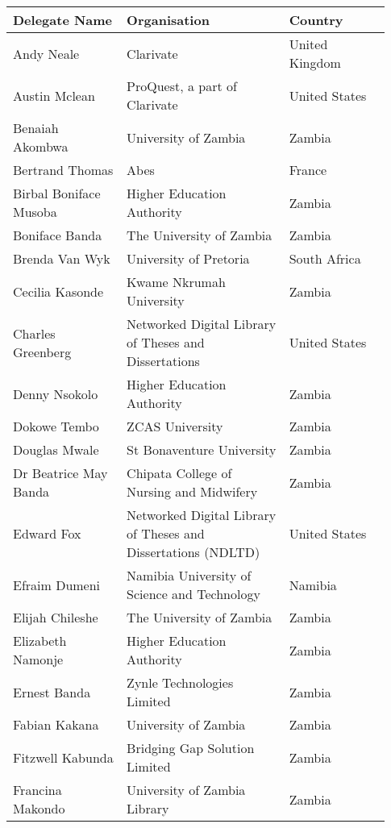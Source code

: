 
\begin{center}
\begin{longtable}{p{0.28\linewidth} p{0.4\linewidth} p{0.25\linewidth}}
\toprule
\textbf{Delegate Name} & \textbf{Organisation} & \textbf{Country} \\
\midrule
Andy Neale & Clarivate & United Kingdom \\  \hline
Austin Mclean & ProQuest, a part of Clarivate & United States \\  \hline
Benaiah Akombwa & University of Zambia & Zambia \\  \hline
Bertrand Thomas & Abes & France \\  \hline
Birbal Boniface Musoba & Higher Education Authority & Zambia \\  \hline
Boniface Banda & The University of Zambia & Zambia \\  \hline
Brenda Van Wyk & University of Pretoria & South Africa \\  \hline
Cecilia Kasonde & Kwame Nkrumah University & Zambia \\  \hline
Charles Greenberg & Networked Digital Library of Theses and Dissertations & United States \\  \hline
Denny Nsokolo & Higher Education Authority & Zambia \\  \hline
Dokowe Tembo & ZCAS University & Zambia \\  \hline
Douglas Mwale & St Bonaventure University & Zambia \\  \hline
Dr Beatrice May Banda & Chipata College of Nursing and Midwifery & Zambia \\  \hline
Edward Fox & Networked Digital Library of Theses and Dissertations (NDLTD) & United States \\  \hline
Efraim Dumeni & Namibia University of Science and Technology & Namibia \\  \hline
Elijah Chileshe & The University of Zambia & Zambia \\  \hline
Elizabeth Namonje & Higher Education Authority & Zambia \\  \hline
Ernest Banda & Zynle Technologies Limited & Zambia \\  \hline
Fabian Kakana & University of Zambia & Zambia \\  \hline
Fitzwell Kabunda & Bridging Gap Solution Limited & Zambia \\  \hline
Francina Makondo & University of Zambia Library & Zambia \\  \hline

\end{longtable}
\end{center}
